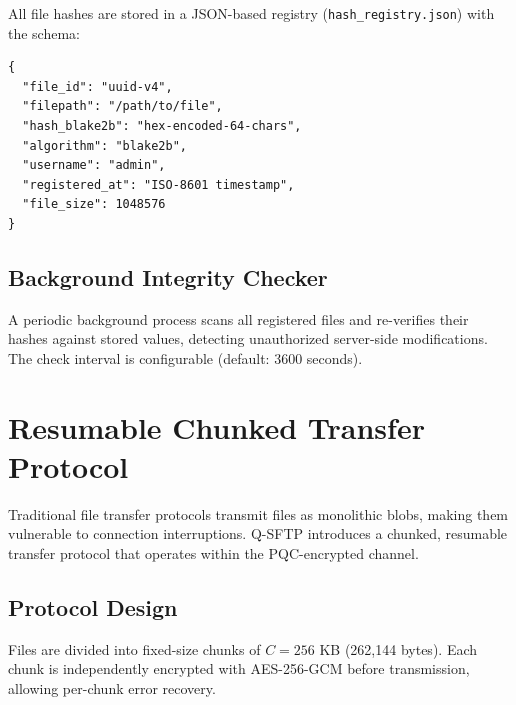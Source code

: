 \documentclass[12pt, a4paper]{article}
\begin{document}
All file hashes are stored in a JSON-based registry (\texttt{hash\_registry.json}) with the schema:

\begin{lstlisting}[language={}, caption={Hash registry entry schema}, label={lst:hash}]
{
  "file_id": "uuid-v4",
  "filepath": "/path/to/file",
  "hash_blake2b": "hex-encoded-64-chars",
  "algorithm": "blake2b",
  "username": "admin",
  "registered_at": "ISO-8601 timestamp",
  "file_size": 1048576
}
\end{lstlisting}

\subsection{Background Integrity Checker}

A periodic background process scans all registered files and re-verifies their hashes against stored values, detecting unauthorized server-side modifications. The check interval is configurable (default: 3600 seconds).

\section{Resumable Chunked Transfer Protocol}
\label{sec:resumable}

Traditional file transfer protocols transmit files as monolithic blobs, making them vulnerable to connection interruptions. Q-SFTP introduces a chunked, resumable transfer protocol that operates within the PQC-encrypted channel.

\subsection{Protocol Design}

Files are divided into fixed-size chunks of $C = 256$ KB (262,144 bytes). Each chunk is independently encrypted with AES-256-GCM before transmission, allowing per-chunk error recovery.
\end{document}
